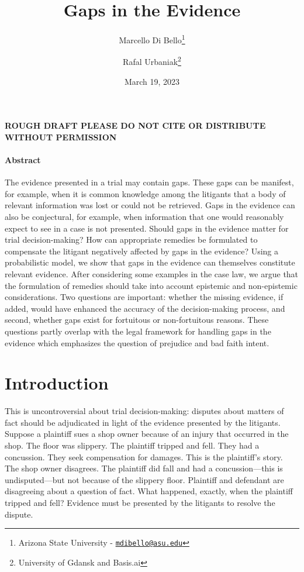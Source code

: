 \documentclass[
  10pt,
  dvipsnames,enabledeprecatedfontcommands]{scrartcl}
\title{Gaps in the Evidence}
\author{Marcello Di Bello\footnote{Arizona State University -
  \href{mailto:mdibello@asu.edu}{\nolinkurl{mdibello@asu.edu}}} \and Rafal
Urbaniak\footnote{University of Gdansk and Basis.ai}}
\date{March 19, 2023}
\begin{document}
\maketitle

\textbf{ROUGH DRAFT PLEASE DO NOT CITE OR DISTRIBUTE WITHOUT PERMISSION}

\paragraph*{Abstract}

The evidence presented in a trial may contain gaps. These gaps can be
manifest, for example, when it is common knowledge among the litigants
that a body of relevant information was lost or could not be retrieved.
Gaps in the evidence can also be conjectural, for example, when
information that one would reasonably expect to see in a case is not
presented. Should gaps in the evidence matter for trial decision-making?
How can appropriate remedies be formulated to compensate the litigant
negatively affected by gaps in the evidence? Using a probabilistic
model, we show that gaps in the evidence can themselves constitute
relevant evidence. After considering some examples in the case law, we
argue that the formulation of remedies should take into account
epistemic and non-epistemic considerations. Two questions are important:
whether the missing evidence, if added, would have enhanced the accuracy
of the decision-making process, and second, whether gaps exist for
fortuitous or non-fortuitous reasons. These questions partly overlap
with the legal framework for handling gaps in the evidence which
emphasizes the question of prejudice and bad faith intent.

\tableofcontents

\hypertarget{introduction}{%
\section{Introduction}\label{introduction}}

This is uncontroversial about trial decision-making: disputes about
matters of fact should be adjudicated in light of the evidence presented
by the litigants. Suppose a plaintiff sues a shop owner because of an
injury that occurred in the shop. The floor was slippery. The plaintiff
tripped and fell. They had a concussion. They seek compensation for
damages. This is the plaintiff's story. The shop owner disagrees. The
plaintiff did fall and had a concussion---this is undisputed---but not
because of the slippery floor. Plaintiff and defendant are disagreeing
about a question of fact. What happened, exactly, when the plaintiff
tripped and fell? Evidence must be presented by the litigants to resolve
the dispute.
\end{document}
